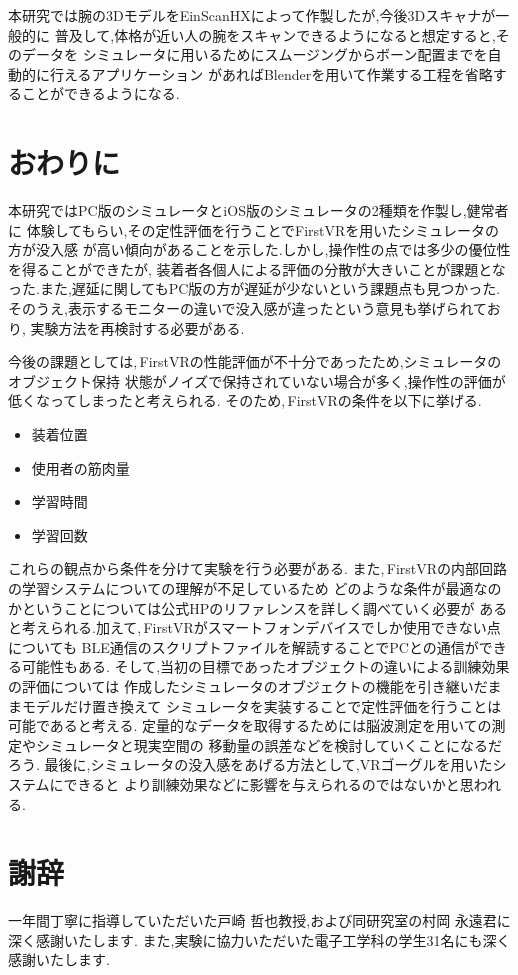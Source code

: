 \documentclass{ltjsreport}
\begin{document}
	本研究では腕の3DモデルをEinScanHXによって作製したが,今後3Dスキャナが一般的に
	普及して,体格が近い人の腕をスキャンできるようになると想定すると,そのデータを
	シミュレータに用いるためにスムージングからボーン配置までを自動的に行えるアプリケーション
	があればBlenderを用いて作業する工程を省略することができるようになる.

\chapter{おわりに}
	本研究ではPC版のシミュレータとiOS版のシミュレータの2種類を作製し,健常者に
	体験してもらい,その定性評価を行うことでFirstVRを用いたシミュレータの方が没入感
	が高い傾向があることを示した.しかし,操作性の点では多少の優位性を得ることができたが,
	装着者各個人による評価の分散が大きいことが課題となった.また,遅延に関してもPC版の方が遅延が少ないという課題点も見つかった.
	そのうえ,表示するモニターの違いで没入感が違ったという意見も挙げられており,
	実験方法を再検討する必要がある.

	今後の課題としては,\,FirstVRの性能評価が不十分であったため,シミュレータのオブジェクト保持
	状態がノイズで保持されていない場合が多く,操作性の評価が低くなってしまったと考えられる.
	そのため,\,FirstVRの条件を以下に挙げる.
	\begin{itemize}
		\item 装着位置
		\item 使用者の筋肉量
		\item 学習時間
		\item 学習回数
	\end{itemize}
	これらの観点から条件を分けて実験を行う必要がある.
	また,\,FirstVRの内部回路の学習システムについての理解が不足しているため
	どのような条件が最適なのかということについては公式HPのリファレンスを詳しく調べていく必要が
	あると考えられる.加えて,\,FirstVRがスマートフォンデバイスでしか使用できない点についても
	BLE通信のスクリプトファイルを解読することでPCとの通信ができる可能性もある.
	そして,当初の目標であったオブジェクトの違いによる訓練効果の評価については
	作成したシミュレータのオブジェクトの機能を引き継いだままモデルだけ置き換えて
	シミュレータを実装することで定性評価を行うことは可能であると考える.
	定量的なデータを取得するためには脳波測定を用いての測定やシミュレータと現実空間の
	移動量の誤差などを検討していくことになるだろう.
	最後に,シミュレータの没入感をあげる方法として,VRゴーグルを用いたシステムにできると
	より訓練効果などに影響を与えられるのではないかと思われる.
\clearpage

\chapter*{謝辞}
一年間丁寧に指導していただいた戸崎 哲也教授,および同研究室の村岡 永遠君に深く感謝いたします.
また,実験に協力いただいた電子工学科の学生31名にも深く感謝いたします.
\end{document}
